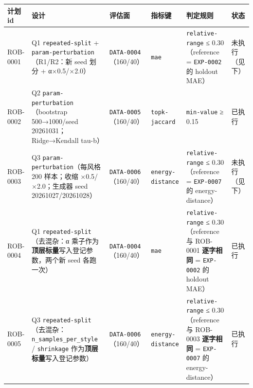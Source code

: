 \documentclass[
  11pt,
]{ctexart}
\newcounter{none} %
\begin{document}
{\def\LTcaptype{none} %
\begin{longtable}[]{@{}
  >{\raggedright\arraybackslash}p{}
  >{\raggedright\arraybackslash}p{}
  >{\raggedright\arraybackslash}p{}
  >{\raggedright\arraybackslash}p{}
  >{\raggedright\arraybackslash}p{}
  >{\raggedright\arraybackslash}p{}@{}}
\toprule\noalign{}
\begin{minipage}[b]{\linewidth}\raggedright
计划 id
\end{minipage} & \begin{minipage}[b]{\linewidth}\raggedright
设计
\end{minipage} & \begin{minipage}[b]{\linewidth}\raggedright
评估面
\end{minipage} & \begin{minipage}[b]{\linewidth}\raggedright
指标键
\end{minipage} & \begin{minipage}[b]{\linewidth}\raggedright
判定规则
\end{minipage} & \begin{minipage}[b]{\linewidth}\raggedright
状态
\end{minipage} \\
\midrule\noalign{}
\endhead
\bottomrule\noalign{}
\endlastfoot
ROB-0001 & Q1 \texttt{repeated-split} +
\texttt{param-perturbation}（R1/R2：新 seed 划分 + α×0.5/×2.0） &
\texttt{DATA-0004}（160/40） & \texttt{mae} & \texttt{relative-range} ≤
0.30（reference = \texttt{EXP-0002} 的 holdout MAE） & 未执行（见下） \\
ROB-0002 & Q2 \texttt{param-perturbation}（bootstrap 500→1000/seed
20261031；Ridge→Kendall tau-b） & \texttt{DATA-0005}（160/40） &
\texttt{topk-jaccard} & \texttt{min-value} ≥ 0.15 & 已执行 \\
ROB-0003 & Q3 \texttt{param-perturbation}（每风格 200 样本；收缩
×0.5/×2.0；生成器 seed 20261027/20261028） &
\texttt{DATA-0006}（160/40） & \texttt{energy-distance} &
\texttt{relative-range} ≤ 0.30（reference = \texttt{EXP-0007} 的
energy-distance） & 未执行（见下） \\
ROB-0004 & Q1 \texttt{repeated-split}（去混杂：α
乘子作为\textbf{顶层标量}写入登记参数，两个新 seed 各跑一次） &
\texttt{DATA-0004}（160/40） & \texttt{mae} & \texttt{relative-range} ≤
0.30（reference 与 ROB-0001 \textbf{逐字相同} = \texttt{EXP-0002} 的
holdout MAE） & 已执行 \\
ROB-0005 & Q3
\texttt{repeated-split}（去混杂：\texttt{n\_\allowbreak{}samples\_\allowbreak{}per\_\allowbreak{}style} /
\texttt{shrinkage} 作为\textbf{顶层标量}写入登记参数） &
\texttt{DATA-0006}（160/40） & \texttt{energy-distance} &
\texttt{relative-range} ≤ 0.30（reference 与 ROB-0003 \textbf{逐字相同}
= \texttt{EXP-0007} 的 energy-distance） & 已执行 \\
\end{longtable}
}
\end{document}
